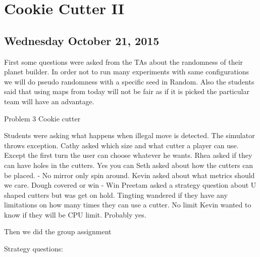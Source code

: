 \section{Cookie Cutter II}
\subsection{Wednesday October 21, 2015}
First some questions were asked from the TAs about the randomness of their planet builder.
In order not to run many experiments with same configurations we will do pseudo randomness with a specific seed in Random. 
Also the students said that using maps from today will not be fair as if it is picked the particular team will have an advantage.

Problem 3 Cookie cutter

Students were asking what happens when illegal move is detected.
The simulator throws exception.
Cathy asked which size and what cutter a player can use.
Except the first turn the user can choose whatever he wants.
Rhea asked if they can have holes in the cutters. Yes you can
Seth asked about how the cutters can be placed. - No mirror only spin around.
Kevin asked about what metrics should we care. Dough covered or win - Win
Preetam asked a strategy question about U shaped cutters but was get on hold.
Tingting wandered if they have any limitations on how many times they can use a cutter. No limit
Kevin wanted to know if they will be CPU limit. Probably yes.

Then we did the group assignment 

Strategy questions:

